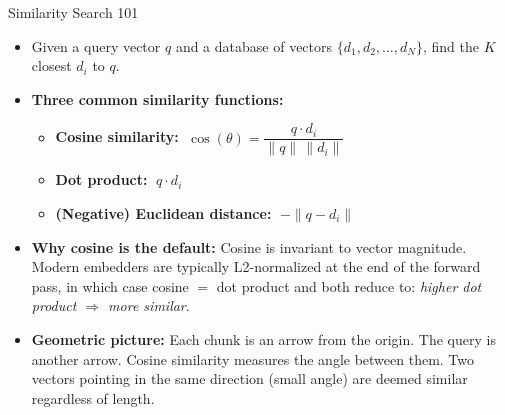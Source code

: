 \documentclass[10pt,english,aspectratio=169]{beamer}
\begin{document}
\begin{frame}{Similarity Search 101}
\begin{itemize}
\item Given a query vector $q$ and a database of vectors $\{d_1, d_2, \dots, d_N\}$, find the $K$ closest $d_i$ to $q$.

\medskip
\item \textbf{Three common similarity functions:}
\begin{itemize}
    \item \textbf{Cosine similarity:} $\;\cos(\theta) = \dfrac{q \cdot d_i}{\|q\| \, \|d_i\|}$
    \item \textbf{Dot product:} $\;q \cdot d_i$
    \item \textbf{(Negative) Euclidean distance:} $\;-\|q - d_i\|$
\end{itemize}

\medskip
\item \textbf{Why cosine is the default:} Cosine is invariant to vector magnitude. Modern embedders are typically L2-normalized at the end of the forward pass, in which case cosine $=$ dot product and both reduce to: \emph{higher dot product $\Rightarrow$ more similar}.

\medskip
\item \textbf{Geometric picture:} Each chunk is an arrow from the origin. The query is another arrow. Cosine similarity measures the angle between them. Two vectors pointing in the same direction (small angle) are deemed similar regardless of length.
\end{itemize}
\end{frame}
\end{document}
